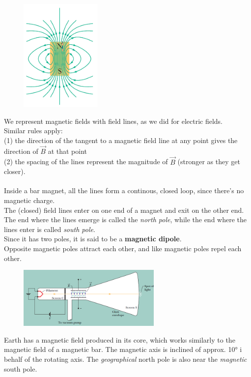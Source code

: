 \documentclass[12pt, a4paper]{article}
\begin{document}
		\begin{figure}
			\centering
			\includegraphics[width=4cm]{Physics2_PNGs/magnetic-field-lines.png}
			\caption*{}
			\label{fig:magnetic-field-lines.png}
		\end{figure}
		We represent magnetic fields with field lines, as we did for electric fields. 
		\\
		Similar rules apply: \\ 
		(1) the direction of the tangent to a magnetic field line at any point gives the direction of $\vec{B}$ at that point \\
		(2) the spacing of the lines represent the magnitude of $\vec{B}$ (stronger as they get closer). \\ \\
		Inside a bar magnet, all the lines form a continous, closed loop, since there's no magnetic charge. \\
		The (closed) field lines enter on one end of a magnet and exit on the other end. \\ The end where the lines emerge is called the \textit{north pole}, while the end where the lines enter is called \textit{south pole}. \\
		Since it has two poles, it is said to be a \textbf{magnetic dipole}. \\ 
		Opposite magnetic poles attract each other, and like magnetic poles repel each other. \\ 
		\begin{figure}
			\centering
			\includegraphics[width=7cm]{Physics2_PNGs/electron-vacuum-measure.png}
			\caption*{}
			\label{fig:electron-vacuum-measure.png}
		\end{figure}
		Earth has a magnetic field produced in its core, which works similarly to the magnetic field of a magnetic bar. The magnetic axis is inclined of approx. 10° i behalf of the rotating axis. The \textit{geographical} north pole is also near the \textit{magnetic} south pole.
		
\end{document}
